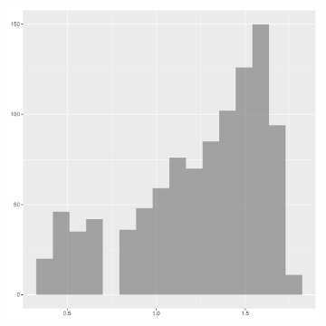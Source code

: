 \begin{figure}[htbp]
\begin{subfigure}[t]{0.45\textwidth}
        \includegraphics[width=\textwidth]{output/bandwidths-x2}
        \label{fig:bandwidths:unif_100_1.0_1h:x2}
    \end{subfigure}


\end{figure}
